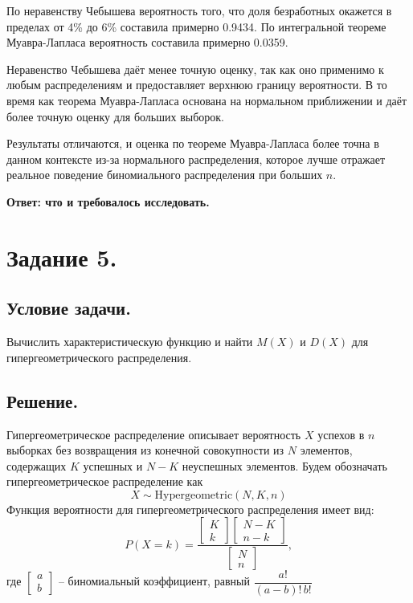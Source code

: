 \documentclass[a4paper, 12pt]{article}
\begin{document}
    По неравенству Чебышева вероятность того, что доля безработных окажется в пределах от 4\% до 6\% составила примерно 
    0.9434. По интегральной теореме Муавра-Лапласа вероятность составила примерно 0.0359.


    Неравенство Чебышева даёт менее точную оценку, так как оно применимо к любым распределениям и предоставляет верхнюю границу вероятности.
    В то время как теорема Муавра-Лапласа основана на нормальном приближении и даёт более точную оценку для больших выборок.

    Результаты отличаются, и оценка по теореме Муавра-Лапласа более точна в данном контексте из-за нормального распределения,
    которое лучше отражает реальное поведение биномиального распределения при больших $n$.


    \textbf{Ответ: что и требовалось исследовать.}


    \section{Задание 5.}
    \subsection{Условие задачи.}
    Вычислить характеристическую функцию и найти $M(X)$ и $D(X)$ для
    гипергеометрического распределения.


    \subsection{Решение.}
    Гипергеометрическое распределение описывает вероятность $X$ успехов в $n$ выборках без возвращения из конечной совокупности из
    $N$ элементов, содержащих $K$ успешных и $N-K$ неуспешных элементов. Будем обозначать гипергеометрическое распределение как
    $$X\sim \text{Hypergeometric}(N,K,n)$$
    Функция вероятности для гипергеометрического распределения имеет вид:
    $$
    P(X=k)=
    \dfrac{
        \begin{bmatrix}
            K\\
            k
        \end{bmatrix}
        \begin{bmatrix}
            N-K\\
            n-k
        \end{bmatrix}
    }{
        \begin{bmatrix}
            N\\
            n
        \end{bmatrix}
    },
    $$
    где
    $
    \begin{bmatrix}
        a\\
        b
    \end{bmatrix}
    $
    -- биномиальный коэффициент, равный
    $
    \dfrac{a!}{(a-b)!\,b!}
    $
\end{document}
